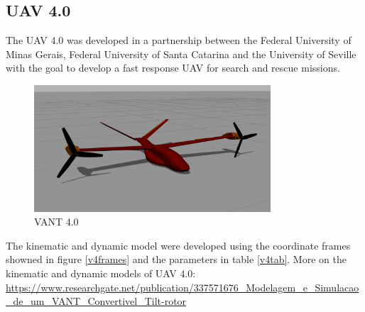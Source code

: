\subsection{UAV 4.0}

The UAV 4.0 was developed in a partnership between the Federal University of Minas Gerais, Federal University of Santa Catarina and the University of Seville with the goal to develop a fast response UAV for search and rescue missions.


\begin{figure}[!ht]
	\centering
	\includegraphics[width=250pt]{figuras/vant4.png}
	\caption{VANT 4.0}
	\label{vant4}
\end{figure}


The kinematic and dynamic model were developed using the coordinate frames showned in figure \ref{v4frames} and the parameters in table \ref{v4tab}. More on the kinematic and dynamic models of UAV 4.0: \url{https://www.researchgate.net/publication/337571676_Modelagem_e_Simulacao_de_um_VANT_Convertivel_Tilt-rotor}


